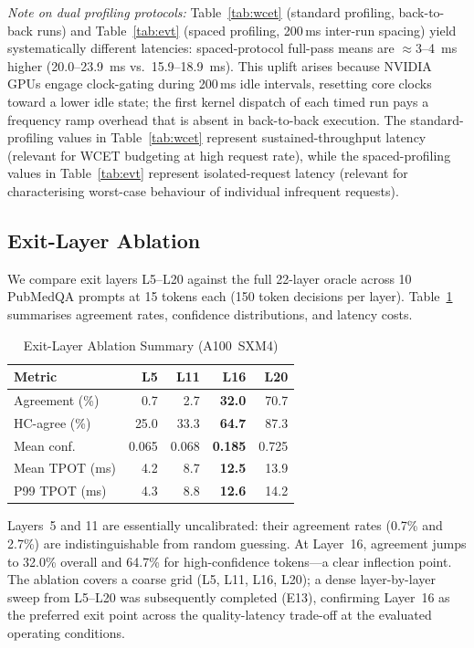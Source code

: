 \documentclass[conference]{IEEEtran}
\begin{document}
\smallskip\noindent\textit{Note on dual profiling protocols:}
Table~\ref{tab:wcet} (standard profiling, back-to-back runs) and
Table~\ref{tab:evt} (spaced profiling, 200\,ms inter-run spacing) yield
systematically different latencies: spaced-protocol full-pass means are
${\approx}3$--4~ms higher (20.0--23.9~ms vs.\ 15.9--18.9~ms).
This uplift arises because NVIDIA GPUs engage clock-gating during
200\,ms idle intervals, resetting core clocks toward a lower idle state;
the first kernel dispatch of each timed run pays a frequency ramp
overhead that is absent in back-to-back execution.
The standard-profiling values in Table~\ref{tab:wcet} represent
sustained-throughput latency (relevant for WCET budgeting at high
request rate), while the spaced-profiling values in Table~\ref{tab:evt}
represent isolated-request latency (relevant for characterising
worst-case behaviour of individual infrequent requests).

\subsection{Exit-Layer Ablation}
\label{sec:ablation}

We compare exit layers L5--L20 against the full 22-layer oracle across
10 PubMedQA prompts at 15 tokens each (150 token decisions per layer).
Table~\ref{tab:ablation} summarises agreement rates, confidence
distributions, and latency costs.

\begin{table}[htbp]
\caption{Exit-Layer Ablation Summary (A100~SXM4)}
\centering
\setlength{\tabcolsep}{3pt}
\begin{tabular}{@{}lrrrr@{}}
\toprule
\textbf{Metric} & \textbf{L5} & \textbf{L11} & \textbf{L16} & \textbf{L20} \\
\midrule
Agreement (\%)        & 0.7  & 2.7  & \textbf{32.0} & 70.7 \\
HC-agree (\%)         & 25.0 & 33.3 & \textbf{64.7} & 87.3 \\
Mean conf.            & 0.065& 0.068& \textbf{0.185}& 0.725 \\
Mean TPOT (ms)        & 4.2  & 8.7  & \textbf{12.5} & 13.9 \\
P99 TPOT (ms)         & 4.3  & 8.8  & \textbf{12.6} & 14.2 \\
\bottomrule
\end{tabular}
\label{tab:ablation}
\end{table}

Layers~5 and 11 are essentially uncalibrated: their agreement rates
(0.7\% and 2.7\%) are indistinguishable from random guessing.
At Layer~16, agreement jumps to 32.0\% overall and 64.7\% for
high-confidence tokens---a clear inflection point.
The ablation covers a coarse grid (L5, L11, L16, L20); a dense
layer-by-layer sweep from L5--L20 was subsequently completed (E13),
confirming Layer~16 as the preferred exit point across the
quality-latency trade-off at the evaluated operating conditions.
\end{document}
